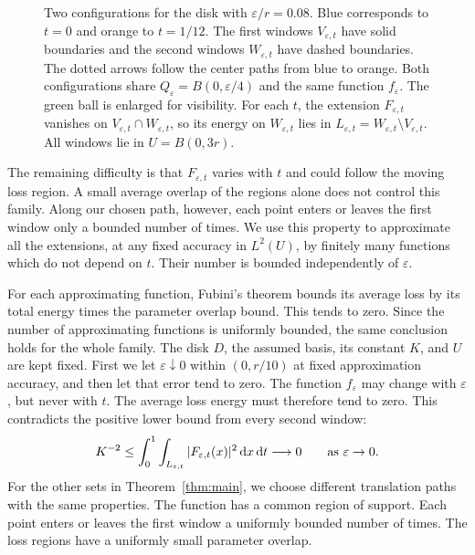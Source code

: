 \documentclass[12pt,reqno,tbtags]{amsart}
\def\d{\mathrm{d}}
\newcommand\1{\mathbbm{1}}
\newcommand{\eps}{\varepsilon}
\def\d{\mathrm{d}}
\begin{document}
\begin{figure}[H]
    \makeatletter
    \def\@captionfont{\normalfont\small}
    \makeatother
    \caption{Two configurations for the disk with $\eps/r=0.08$.
    Blue corresponds to $t=0$ and orange to $t=1/12$.
    The first windows $V_{\eps,t}$ have solid boundaries and the second
    windows $W_{\eps,t}$ have dashed boundaries. The dotted arrows follow
    the center paths from blue to orange. Both configurations share
    $Q_\eps=B(0,\eps/4)$ and the same function $f_\eps$.
    The green ball is enlarged for visibility.
    For each $t$, the extension $F_{\eps,t}$ vanishes on
    $V_{\eps,t}\cap W_{\eps,t}$, so its energy on $W_{\eps,t}$ lies in
    $L_{\eps,t}=W_{\eps,t}\setminus V_{\eps,t}$.
    All windows lie in $U=B(0,3r)$.}
    \label{fig:disk-windows}
\end{figure}

The remaining difficulty is that $F_{\eps,t}$ varies with $t$ and could
follow the moving loss region. A small average overlap of the regions alone
does not control this family. Along our chosen path, however, each point
enters or leaves the first window only a bounded number of times.
We use this property to approximate all the extensions, at any fixed
accuracy in $L^2(U)$, by finitely many functions which do not depend on $t$.
Their number is bounded independently of $\eps$.

For each approximating function, Fubini's theorem bounds its average loss
by its total energy times the parameter overlap bound.
This tends to zero. Since the number of approximating functions is uniformly
bounded, the same conclusion holds for the whole family.
The disk $D$, the assumed basis, its constant $K$, and $U$ are kept fixed.
First we let $\eps\downarrow0$ within $(0,r/10)$ at fixed approximation accuracy,
and then let that error tend to zero. The function $f_\eps$ may change with
$\eps$, but never with $t$. The average loss energy must therefore tend to zero.
This contradicts the positive lower bound from every second window:
\begin{equation*}
    K^{-2}\le
    \int_0^1\int_{L_{\eps,t}}|F_{\eps,t}(x)|^2\,\d x\,\d t
    \longrightarrow0\qquad{\rm{as}}\ \eps\to0.
\end{equation*}
For the other sets in Theorem~\ref{thm:main}, we choose different translation
paths with the same properties. The function has a common region of support.
Each point enters or leaves the first window a uniformly bounded number of
times. The loss regions have a uniformly small parameter overlap.
\end{document}
